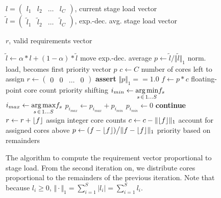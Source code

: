 \documentclass[12pt,a4paper]{book}
\DeclarePairedDelimiter\floor{\lfloor}{\rfloor}
\begin{document}
\begin{figure}
\centering
\begin{minipage}{\linewidth}
\begin{algorithmic}[1]
    \algrenewcommand{}
      \Require   \begin{varwidth}[t]{\linewidth}
        \Statex ${l = \begin{pmatrix} l_1 & l_2 & \dots & l_C \end{pmatrix}}$, current stage load vector
        \Statex ${\tilde{l} = \begin{pmatrix} \tilde{l}_1 & \tilde{l}_2 & \dots & \tilde{l}_C \end{pmatrix}}$, exp.-dec. avg. stage load vector
            \strut
               \end{varwidth}
      \Ensure      \begin{varwidth}[t]{\linewidth}
        \Statex $r$, valid requirements vector
          \strut
               \end{varwidth}

    \State $\tilde{l} \gets \alpha * l + (1 - \alpha) * \tilde{l}$ \Comment move exp.-dec. average
    \State $p \gets \tilde{l} \big/ \Vert \tilde{l} {\Vert}_1$ \Comment norm. load, becomes first priority vector $p$
    \State $c \gets C$ \Comment number of cores left to assign
    \State $r \gets \begin{pmatrix}0 & 0 & \dots & 0\end{pmatrix}$
        \State \textbf{assert} ${\Vert p {\Vert}_1 == 1.0}$
        \State ${f \gets p * c}$ \Comment floating-point core count
         \Comment priority shifting
            \State $i_{min} \gets \underset{s\,\in\,1 \dots S}{\text{arg\,min}} f_s$
            \State $i_{max} \gets \underset{s\,\in\,1 \dots S}{\text{arg\,max}} f_s$
            \State $p_{i_{max}} \gets p_{i_{max}} + p_{i_{min}}$
            \State $p_{i_{min}} \gets 0$
            \State \textbf{continue}
        \EndIf
        \State ${r \gets r + \floor{f}}$ \Comment assign integer core counts
        \State ${c \gets c - \Vert \floor{f} {\Vert}_1}$ \Comment account for assigned cores above
        \State ${p \gets (f - \floor{f}) \big/  \Vert f - \floor{f} {\Vert}_1 }$ \Comment priority based on remainders
    \EndWhile
\end{algorithmic}
\end{minipage}
\caption{
    The algorithm to compute the requirement vector proportional to stage load.
    From the second iteration on, we distribute cores proportional to the remainders of the previous iteration.
    Note that because ${l_i \ge 0}$, ${\Vert\cdot{\Vert}_1 = \sum_{i = 1}^{S} \vert l_i \vert = \sum_{i = 1}^{S} l_i}$.
}
\label{fig:di:pol:reqvectoralg}
\end{figure}
\end{document}
